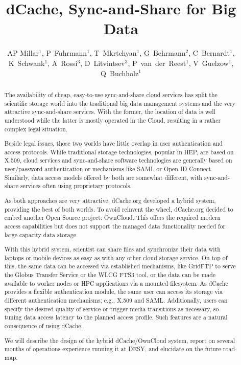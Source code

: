 \documentclass[a4paper]{jpconf}
\begin{document}
\title{dCache, Sync-and-Share for Big Data}

\author{AP Millar$^1$, P~Fuhrmann$^1$, T~Mkrtchyan$^1$,
  G~Behrmann$^2$, C~Bernardt$^1$, K~Schwank$^1$, A~Rossi$^3$,
  D~Litvintsev$^3$, P~van~der~Reest$^1$, V~Guelzow$^1$,
  Q~Buchholz$^1$}

\address{$^1$ IT Dept., DESY, Notkestrasse 85, Hamburg, Germany}
\address{$^2$ Gerd Behrmann, Copenhagen, Denmark}
\address{$^3$ Fermilab, Batavia, IL, USA}


\begin{abstract}
The availability of cheap, easy-to-use sync-and-share cloud services
has split the scientific storage world into the traditional big data
management systems and the very attractive sync-and-share
services. With the former, the location of data is well understood
while the latter is mostly operated in the Cloud, resulting in a
rather complex legal situation.

Beside legal issues, those two worlds have little overlap in user
authentication and access protocols. While traditional storage
technologies, popular in HEP, are based on X.509, cloud services and
sync-and-share software technologies are generally based on
user/password authentication or mechanisms like SAML or Open ID
Connect. Similarly, data access models offered by both are somewhat
different, with sync-and-share services often using proprietary
protocols.

As both approaches are very attractive, dCache.org developed a hybrid
system, providing the best of both worlds. To avoid reinvent the
wheel, dCache.org decided to embed another Open Source project:
OwnCloud. This offers the required modern access capabilities but does
not support the managed data functionality needed for large capacity
data storage.

With this hybrid system, scientist can share files and synchronize
their data with laptops or mobile devices as easy as with any other
cloud storage service. On top of this, the same data can be accessed
via established mechanisms, like GridFTP to serve the Globus Transfer
Service or the WLCG FTS3 tool, or the data can be made available to
worker nodes or HPC applications via a mounted filesystem. As dCache
provides a flexible authentication module, the same user can access
its storage via different authentication mechanisms; e.g., X.509 and
SAML. Additionally, users can specify the desired quality of service
or trigger media transitions as necessary, so tuning data access
latency to the planned access profile. Such features are a natural
consequence of using dCache.

We will describe the design of the hybrid dCache/OwnCloud system,
report on several months of operations experience running it at DESY,
and elucidate on the future road-map.
\end{abstract}
\end{document}
